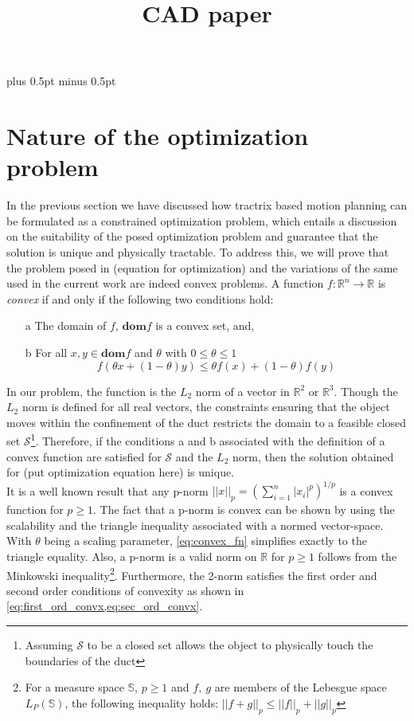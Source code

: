 \documentclass[12pt,a4]{article}
\title{CAD paper}
\author{}
\date{}
\begin{document}
	\baselineskip 18pt plus 0.5pt minus 0.5pt
\maketitle  

\section{Nature of the optimization problem}\label{sc:optimization}
In the previous section we have discussed how tractrix based motion planning can be formulated as a constrained optimization problem, which entails a discussion on the suitability of the posed optimization problem and guarantee that the solution is unique and physically tractable. To address this, we will prove that the problem posed in (equation for optimization) and the variations of the same used in the current work are indeed convex problems. A function $f:\mathbb{R}^n\to \mathbb{R}$ is \textit{convex} if and only if the following two conditions hold:
\begin{enumerate}
	\item [a] The domain of $f$, $\textbf{dom}f$ is a convex set, and,
	\item [b]  For all $x,y \in \textbf{dom}f$ and $\theta$ with $0\leq \theta \leq 1$ \begin{equation}\label{eq:convex_fn}
	f(\theta x+(1-\theta)y)\leq \theta f(x)+(1-\theta)f(y)
	\end{equation}
\end{enumerate}
In our problem, the function is the $L_2$ norm of a vector in $\mathbb{R}^2$ or $\mathbb{R}^3$.  Though the $L_2$ norm is defined for all real vectors, the constraints ensuring that the object moves within the confinement of the duct restricts the domain to a feasible closed set $\mathcal{S}$\footnote{Assuming $\mathcal{S}$ to be a closed set allows the object to physically touch the boundaries of the duct}. Therefore, if the conditions a and b associated with the definition of a convex function are satisfied for $\mathcal{S}$ and the $L_2$ norm, then the solution obtained for (put optimization equation here) is unique.\\
It is a well known result that any p-norm $||x||_p=(\sum\limits_{i=1}^{n}|x_i|^p)^{1/p}$ is a convex function for $p\geq 1$. The fact that a p-norm is convex can be shown by using the scalability and the triangle inequality associated with a normed vector-space. With $\theta$  being a scaling parameter, \cref{eq:convex_fn} simplifies exactly to the triangle equality. Also, a p-norm is a valid norm on $\mathbb{R}$ for $p\geq1$ follows from the Minkowski inequality\footnote{For a measure space $\mathbb{S}$, $p\geq 1$ and $f,~g$ are members of the Lebesgue space $L_P(\mathbb{S})$, the following inequality holds: $||f+g||_p\leq ||f||_p+||g||_p$ }. Furthermore, the 2-norm satisfies the first order and second order conditions of convexity as shown in \cref{eq:first_ord_convx,eq:sec_ord_convx}.
\end{document}
